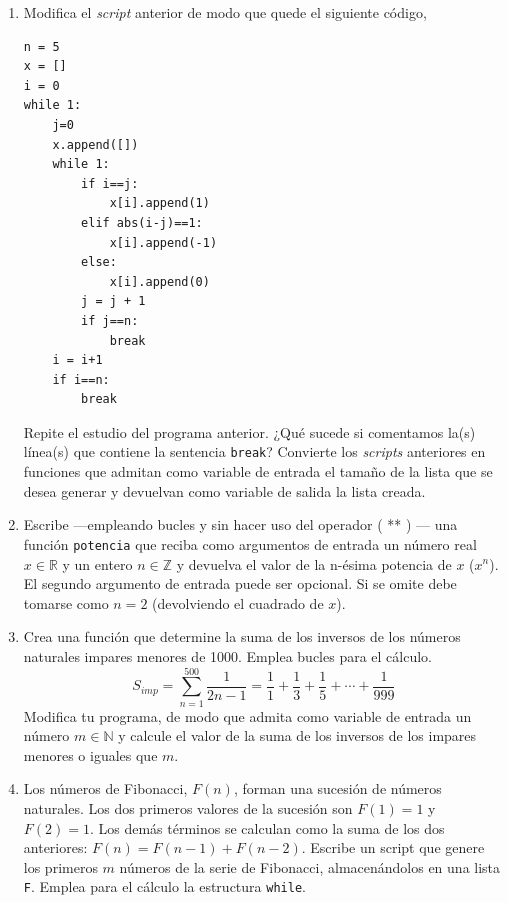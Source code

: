 \begin{enumerate}
Repite el estudio del programa anterior.

\item Modifica el \emph{script} anterior de modo que quede el siguiente código,
\begin{verbatim}
n = 5
x = []
i = 0
while 1:
    j=0
    x.append([])
    while 1:
        if i==j:
            x[i].append(1)
        elif abs(i-j)==1:
            x[i].append(-1)
        else:
            x[i].append(0)
        j = j + 1
        if j==n:
            break
    i = i+1
    if i==n:
        break
\end{verbatim}
Repite el estudio del programa anterior. ¿Qué sucede si comentamos la(s) línea(s) que contiene la sentencia \verb|break|?
Convierte los \emph{scripts} anteriores en funciones que admitan como variable de entrada el tamaño de la lista que se desea generar y devuelvan como variable de salida la lista creada.

\item Escribe ---empleando bucles y sin hacer uso del operador ( ** ) --- una función \verb|potencia| que reciba como argumentos de entrada un número real $x\in \mathbb{R}$ y un entero $n \in \mathbb{Z}$ y devuelva el valor de la n-ésima potencia de $x$ ($x^n$). El segundo argumento de entrada puede ser opcional. Si se omite debe tomarse como $n=2$ (devolviendo el cuadrado de $x$).

\item Crea una función que determine la suma de los inversos de los números naturales impares menores de 1000. Emplea bucles para el cálculo.
\begin{equation*}
S_{imp} = \sum_{n=1}^{500}\frac{1}{2n-1} =\frac{1}{1}+\frac{1}{3}+\frac{1}{5}+\cdots+\frac{1}{999}
\end{equation*}
Modifica tu programa, de modo que admita como variable de entrada un número $m\in\mathbb{N}$ y calcule el valor de la suma de los inversos de los impares menores o iguales que $m$.

\item Los números de Fibonacci, $F(n)$, forman una sucesión de números naturales. Los dos primeros valores de la sucesión son $F(1)=1$ y $F(2)=1$. Los demás términos se calculan como la suma de los dos anteriores: $F(n) = F(n-1) + F(n-2)$.
Escribe un script que genere los primeros $m$ números de la serie de Fibonacci, almacenándolos en una lista \verb|F|. Emplea para el cálculo la estructura \verb|while|.\label{fibonacci}


\end{enumerate}
